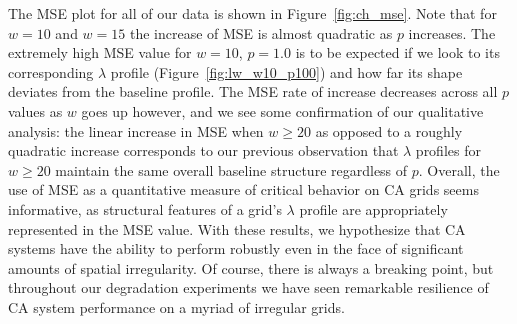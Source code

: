 \documentclass[a4paper,11pt]{article}
\begin{document}
The MSE plot for all of our data is shown in Figure~\ref{fig:ch_mse}. Note that for $w=10$ and $w=15$ the increase of MSE is almost quadratic as $p$ increases. The extremely high MSE value for $w=10$, $p=1.0$ is to be expected if we look to its corresponding $\lambda$ profile (Figure~\ref{fig:lw_w10_p100}) and how far its shape deviates from the baseline profile. The MSE rate of increase decreases across all $p$ values as $w$ goes up however, and we see some confirmation of our qualitative analysis: the linear increase in MSE when $w \ge 20$ as opposed to a roughly quadratic increase corresponds to our previous observation that $\lambda$ profiles for $w \ge 20$ maintain the same overall baseline structure regardless of $p$. Overall, the use of MSE as a quantitative measure of critical behavior on CA grids seems informative, as structural features of a grid's $\lambda$ profile are appropriately represented in the MSE value. With these results, we hypothesize that CA systems have the ability to perform robustly even in the face of significant amounts of spatial irregularity. Of course, there is always a breaking point, but throughout our degradation experiments we have seen remarkable resilience of CA system performance on a myriad of irregular grids.
\end{document}
